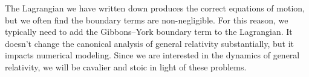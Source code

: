 \begin{danger}
The Lagrangian we have written down produces the correct equations of
motion, but we often find the boundary terms are non-negligible. For
this reason, we typically need to add the Gibbons--York boundary term to
the Lagrangian. It doesn't change the canonical analysis of general
relativity substantially, but it impacts numerical modeling. Since we
are interested in the dynamics of general relativity, we will be
cavalier and stoic in light of these problems.
\end{danger}